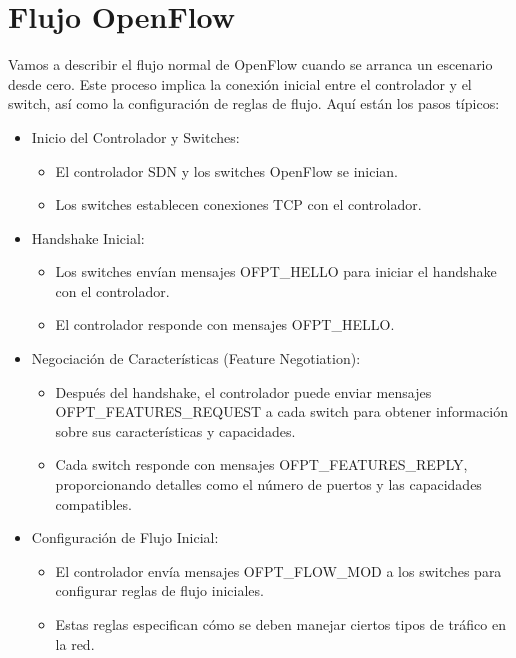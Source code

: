 \documentclass[a4paper, 12pt]{book}
\begin{document}
	\section{Flujo OpenFlow}
	Vamos a describir el flujo normal de OpenFlow cuando se arranca un escenario desde cero. Este proceso implica la conexión inicial entre el controlador y el switch, así como la configuración de reglas de flujo. Aquí están los pasos típicos:
	
	\begin{itemize}
		\item Inicio del Controlador y Switches:
		\begin{itemize}
			\item El controlador SDN y los switches OpenFlow se inician.
			\item Los switches establecen conexiones TCP con el controlador.
		\end{itemize}
		
		\item Handshake Inicial:
		\begin{itemize}
			\item Los switches envían mensajes OFPT\_HELLO para iniciar el handshake con el controlador.
			\item El controlador responde con mensajes OFPT\_HELLO.
		\end{itemize}
		
		\item Negociación de Características (Feature Negotiation):
		\begin{itemize}
			\item Después del handshake, el controlador puede enviar mensajes OFPT\_FEATURES\_REQUEST
			a cada switch para obtener información sobre sus características y capacidades.
			\item Cada switch responde con mensajes OFPT\_FEATURES\_REPLY, proporcionando detalles como
			el número de puertos y las capacidades compatibles.
		\end{itemize}
		
		\item Configuración de Flujo Inicial:
		\begin{itemize}
			\item El controlador envía mensajes OFPT\_FLOW\_MOD a los switches para configurar reglas
			de flujo iniciales.
			\item Estas reglas especifican cómo se deben manejar ciertos tipos de tráfico en la red.
		\end{itemize}
		

\end{itemize}
\end{document}
